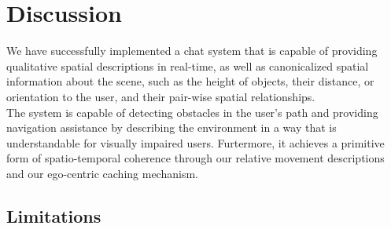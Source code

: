 \section{Discussion}

We have successfully implemented a chat system that is capable of providing qualitative spatial descriptions in real-time, as well as canonicalized spatial information about the scene, such as the height of objects, their distance, or orientation to the user, and their pair-wise spatial relationships.\\

The system is capable of detecting obstacles in the user's path and providing navigation assistance by describing the environment in a way that is understandable for visually impaired users. Furtermore, it achieves a primitive form of spatio-temporal coherence through our relative movement descriptions and our ego-centric caching mechanism.


\subsection{Limitations}

